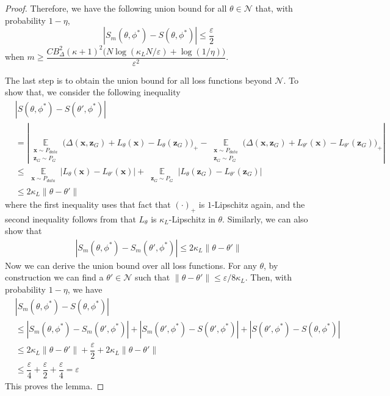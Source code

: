 \documentclass[11pt,fullpage, letterpaper,twoside]{article}
\newcommand{\1}[1]{\mathds{1}_{\left[#1\right]}}
\begin{document}
\begin{proof}
Therefore, we have the following union bound for all $\theta\in\mathcal N$ that, with probability $1-\eta$,
$$
|S_m(\theta,\phi^*)-S(\theta,\phi^*)|\leq \dfrac{\varepsilon}{2}
$$
when $m\geq\dfrac{C B_\Delta^2(\kappa+1)^2 \big(N \log(\kappa_L N/\varepsilon)+\log(1/\eta)\big)}{\varepsilon^2}$.

The last step is to obtain the union bound for all loss functions beyond $\mathcal N$. To show that, we consider the following inequality
\[
\begin{aligned}
&|S(\theta,\phi^*)-S(\theta',\phi^*)|\\
&=|\mathop\mathbb E\limits_{\substack{\mathbf x\sim P_{data}\\ \mathbf z_G\sim P_G}} \big(\Delta(\mathbf x, \mathbf z_G)+ L_{\theta}(\mathbf x)- L_{\theta}(\mathbf z_G)\big)_+
-\mathop\mathbb E\limits_{\substack{\mathbf x\sim P_{data}\\ \mathbf z_G\sim P_G}} \big(\Delta(\mathbf x, \mathbf z_G)+ L_{\theta'}(\mathbf x)- L_{\theta'}(\mathbf z_G)\big)_+|\\
&\leq \mathop\mathbb E\limits_{\substack{\mathbf x\sim P_{data}}}|L_{\theta}(\mathbf x)-L_{\theta'}(\mathbf x)|+\mathop\mathbb E\limits_{\substack{ \mathbf z_G\sim P_G}}|L_{\theta}(\mathbf z_G)-L_{\theta'}(\mathbf z_G)|\\
&\leq 2\kappa_L\|\theta-\theta'\|
\end{aligned}
\]
where the first inequality uses that fact that $(\cdot)_+$ is $1$-Lipschitz again, and the second inequality follows from that $L_\theta$ is $\kappa_L$-Lipschitz in $\theta$.
Similarly, we can also show that
\[
\begin{aligned}
|S_m(\theta,\phi^*)-S_m(\theta',\phi^*)|
\leq 2\kappa_L\|\theta-\theta'\|
\end{aligned}
\]
Now we can derive the union bound over all loss functions. For any $\theta$, by construction we can find a $\theta'\in\mathcal N$ such that $\|\theta-\theta'\|\leq\varepsilon/8\kappa_L$.
Then, with probability $1-\eta$, we have
\[
\begin{aligned}
&|S_m(\theta,\phi^*)-S(\theta,\phi^*)|\\
&\leq|S_m(\theta,\phi^*)-S_m(\theta',\phi^*)|
+|S_m(\theta',\phi^*)-S(\theta',\phi^*)|+|S(\theta',\phi^*)-S(\theta,\phi^*)|\\
&\leq 2\kappa_L\|\theta-\theta'\|+\dfrac{\varepsilon}{2}+2\kappa_L\|\theta-\theta'\|\\
&\leq\dfrac{\varepsilon}{4}+\dfrac{\varepsilon}{2}+\dfrac{\varepsilon}{4}=\varepsilon
\end{aligned}
\]
This proves the lemma.
\end{proof}
\end{document}
